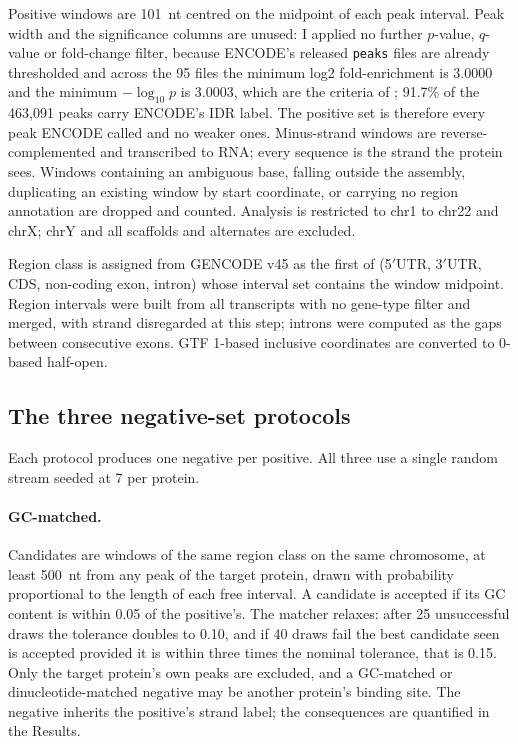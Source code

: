 Positive windows are 101~nt centred on the midpoint of each peak interval. Peak width and the
significance columns are unused: I applied no further $p$-value, $q$-value or fold-change
filter, because ENCODE's released \texttt{peaks} files are already thresholded and across the 95
files the minimum log2 fold-enrichment is 3.0000 and the minimum $-\log_{10}p$ is 3.0003, which
are the criteria of \citet{vannostrand2020}; 91.7\% of the 463{,}091 peaks carry ENCODE's IDR
label. The positive set is therefore every peak ENCODE called and no weaker ones. Minus-strand
windows are reverse-complemented
and transcribed to RNA; every sequence is the strand the protein sees. Windows containing an
ambiguous base, falling outside the assembly, duplicating an existing window by start
coordinate, or carrying no region annotation are dropped and counted. Analysis is restricted to
chr1 to chr22 and chrX; chrY and all scaffolds and alternates are excluded.

Region class is assigned from GENCODE v45 \citep{frankish2023} as the first of (5$'$UTR,
3$'$UTR, CDS, non-coding exon, intron) whose interval set contains the window midpoint. Region
intervals were built from all transcripts with no
gene-type filter and merged, with strand disregarded at this step; introns were computed as the
gaps between consecutive exons.
GTF 1-based inclusive coordinates are converted to 0-based half-open.

\subsection{The three negative-set protocols}
\label{sec:protocols}

Each protocol produces one negative per positive. All three use a single random stream seeded at
7 per protein.

\paragraph{GC-matched.} Candidates are windows of the same region class on the same chromosome,
at least 500~nt from any peak of the target protein, drawn with probability proportional to the
length of each free interval. A candidate is accepted if its GC content is within 0.05 of the
positive's. The matcher relaxes: after 25 unsuccessful draws the tolerance doubles to 0.10, and
if 40 draws fail the best candidate seen is accepted provided it is within three times the
nominal tolerance, that is 0.15. Only the target protein's own
peaks are excluded, and a GC-matched or dinucleotide-matched negative may be another protein's
binding site. The negative inherits the positive's strand label; the consequences are quantified
in the Results.

